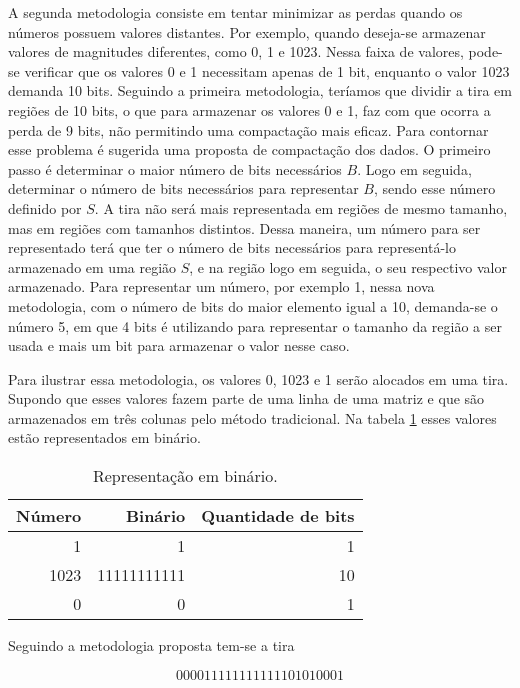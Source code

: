 \documentclass[a4paper,11pt]{article}
\begin{document}
A segunda metodologia consiste em tentar minimizar as perdas quando os números
possuem valores distantes. Por exemplo, quando deseja-se
armazenar valores de magnitudes diferentes, como 0, 1 e 1023. Nessa
faixa de valores, pode-se verificar que os valores 0 e 1 necessitam apenas de 1
bit, enquanto o valor 1023 demanda 10 bits. Seguindo a primeira
metodologia, teríamos que dividir a tira em regiões de 10 bits, o que para
armazenar os valores 0 e 1, faz com que ocorra a perda de 9 bits, não
permitindo uma compactação mais eficaz. Para contornar esse problema é sugerida
uma proposta de compactação dos dados.
O primeiro passo é determinar o maior número de bits necessários $B$. Logo em
seguida, determinar o número de bits necessários para representar $B$, sendo
esse número definido por $S$. A tira não
será mais representada em regiões de mesmo tamanho, mas em regiões com tamanhos
distintos. Dessa maneira, um número para ser representado terá que ter o número
de bits necessários para representá-lo armazenado em uma região $S$, e
na região logo em seguida, o seu respectivo valor armazenado.
Para representar um número, por exemplo 1, nessa nova metodologia, com o número de bits do maior
elemento igual a 10, demanda-se o número 5, em que 4 bits é utilizando para
representar o tamanho da região a ser usada e mais um bit para armazenar o valor
nesse caso. 

Para ilustrar essa metodologia, os valores 0, 1023 e 1 serão
alocados em uma tira. Supondo que esses valores fazem parte de uma linha de
uma matriz e que são armazenados em três colunas pelo método tradicional. Na
tabela \ref{tab:1} esses valores estão representados em binário.

\begin{table}[htpb]
  \centering
  \caption{Representação em binário.}
  \begin{tabular}{rrr}
    \hline
    Número & Binário & Quantidade de bits \\
    \hline
    1		&           1	& 1 \\
    1023	& 11111111111   & 10 \\
    0		&           0	& 1 \\
    \hline
  \end{tabular}
  \label{tab:1}
\end{table}

Seguindo a metodologia proposta tem-se a tira

\begin{equation}
 000011111111111101010001
\end{equation}
\end{document}
